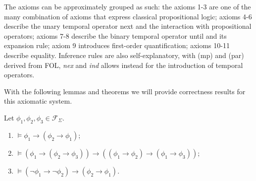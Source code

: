 The axioms can be approximately grouped as such: the axioms 1-3 are one of the many combination of axioms that express
classical propositional logic; axioms 4-6 describe the unary temporal operator next and the interaction with
propositional operators; axioms 7-8 describe the binary temporal operator until and its expansion rule; axiom 9
introduces first-order quantification; axioms 10-11 describe equality. Inference rules are also self-explanatory, with
(mp) and (par) derived from \ac{FOL}, \emph{nex} and \emph{ind} allows instead for the introduction of temporal operators.

With the following lemmas and theorems we will provide correctness results for this axiomatic system.

\begin{lemma}\label{lem:propaxioms}
  Let $\phi_1, \phi_2, \phi_3 \in \mathcal{F}_\Sigma$.
  \begin{enumerate}
    \item $\vDash \phi_1 \to (\phi_2 \to \phi_1)$;
    \item $\vDash (\phi_1 \to (\phi_2 \to \phi_3)) \to ((\phi_1 \to \phi_2) \to (\phi_1 \to \phi_3))$;
    \item $\vDash (\neg\phi_1 \to \neg\phi_2) \to (\phi_2 \to \phi_1)$.
  \end{enumerate}
\end{lemma}
